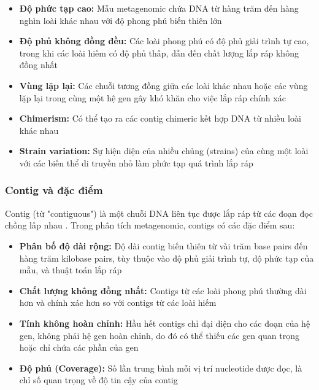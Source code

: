 \begin{itemize}
    \item \textbf{Độ phức tạp cao:} Mẫu metagenomic chứa DNA từ hàng trăm đến hàng nghìn loài khác nhau với độ phong phú biến thiên lớn

    \item \textbf{Độ phủ không đồng đều:} Các loài phong phú có độ phủ giải trình tự cao, trong khi các loài hiếm có độ phủ thấp, dẫn đến chất lượng lắp ráp không đồng nhất

    \item \textbf{Vùng lặp lại:} Các chuỗi tương đồng giữa các loài khác nhau hoặc các vùng lặp lại trong cùng một hệ gen gây khó khăn cho việc lắp ráp chính xác

    \item \textbf{Chimerism:} Có thể tạo ra các contig chimeric kết hợp DNA từ nhiều loài khác nhau

    \item \textbf{Strain variation:} Sự hiện diện của nhiều chủng (strains) của cùng một loài với các biến thể di truyền nhỏ làm phức tạp quá trình lắp ráp
\end{itemize}

\subsubsection{Contig và đặc điểm}

Contig (từ "contiguous") là một chuỗi DNA liên tục được lắp ráp từ các đoạn đọc chồng lấp nhau \cite{setubal2021metagenome,ghurye2016metagenomic}. Trong phân tích metagenomic, contigs có các đặc điểm sau:

\begin{itemize}
    \item \textbf{Phân bố độ dài rộng:} Độ dài contig biến thiên từ vài trăm base pairs đến hàng trăm kilobase pairs, tùy thuộc vào độ phủ giải trình tự, độ phức tạp của mẫu, và thuật toán lắp ráp

    \item \textbf{Chất lượng không đồng nhất:} Contigs từ các loài phong phú thường dài hơn và chính xác hơn so với contigs từ các loài hiếm

    \item \textbf{Tính không hoàn chỉnh:} Hầu hết contigs chỉ đại diện cho các đoạn của hệ gen, không phải hệ gen hoàn chỉnh, do đó có thể thiếu các gen quan trọng hoặc chỉ chứa các phần của gen

    \item \textbf{Độ phủ (Coverage):} Số lần trung bình mỗi vị trí nucleotide được đọc, là chỉ số quan trọng về độ tin cậy của contig
\end{itemize}

